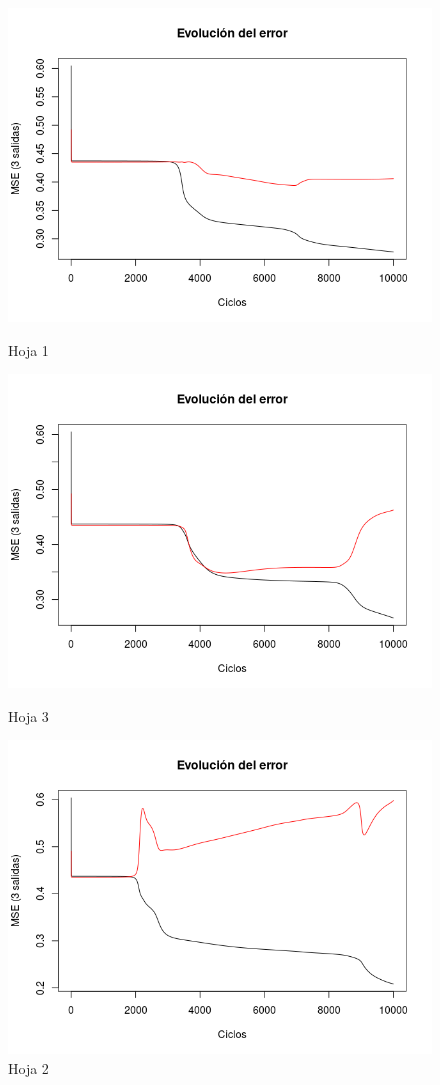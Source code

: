 \documentclass{uc3mpracticas}
\begin{document}
\begin{figure}[!h]
\centering
\begin{minipage}{.52\textwidth}
  \centering
  \includegraphics[width=.8\linewidth]{Images/best_fold1.png}
  \caption*{Hoja 1}

  \includegraphics[width=.8\linewidth]{Images/best_fold3.png}
  \caption*{Hoja 3}
\end{minipage}%
\begin{minipage}{.52\textwidth}
  \centering
  \includegraphics[width=.8\linewidth]{Images/best_fold2.png}
  \caption*{Hoja 2}


\end{minipage}
\end{figure}
\end{document}
